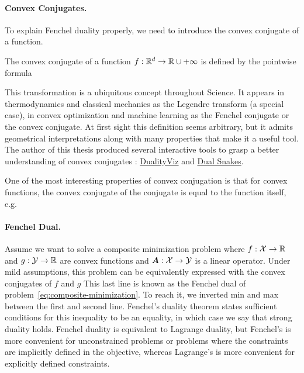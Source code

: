 \paragraph{Convex Conjugates.}
To explain Fenchel duality properly, we need to introduce the convex conjugate of a function.
\begin{definition}
	The convex conjugate of a function $f:\mathbb{R}^d \rightarrow \mathbb{R}\cup{+\infty}$ is defined by the pointwise formula
\end{definition}
This transformation is a ubiquitous concept throughout Science.
 It appears in thermodynamics and classical mechanics as the Legendre transform (a special case), in convex optimization and machine learning as the Fenchel conjugate or the convex conjugate. 
At first sight this definition seems arbitrary, but it admits geometrical interpretations along with many properties that make it a useful tool. 
The author of this thesis produced several interactive tools to grasp a better understanding of convex conjugates : \href{https://remilepriol.github.io/dualityviz/}{DualityViz} and \href{https://remilepriol.github.io/dualityviz/dual_snakes.html}{Dual Snakes}.

One of the most interesting properties of convex conjugation is that for convex functions, the convex conjugate of the conjugate is equal to the function itself, e.g.

\paragraph{Fenchel Dual.}
Assume we want to solve a composite minimization problem
where $f:{\mathcal X} \rightarrow\mathbb{R}$ and $g:{\mathcal Y} \rightarrow \mathbb{R}$ are convex functions and ${\bm{A}}: {\mathcal X} \rightarrow {\mathcal Y}$ is a linear operator.
Under mild assumptions, this problem can be equivalently expressed with the convex conjugates of $f$ and $g$
This last line is known as the Fenchel dual of problem~\eqref{eq:composite-minimization}. 
To reach it, we inverted min and max between the first and second line. 
Fenchel's duality theorem states sufficient conditions for this inequality to be an equality, in which case we say that strong duality holds.
Fenchel duality is equivalent to Lagrange duality, but Fenchel's is more convenient for unconstrained problems or problems where the constraints are implicitly defined in the objective, whereas Lagrange's is more convenient for explicitly defined constraints.

